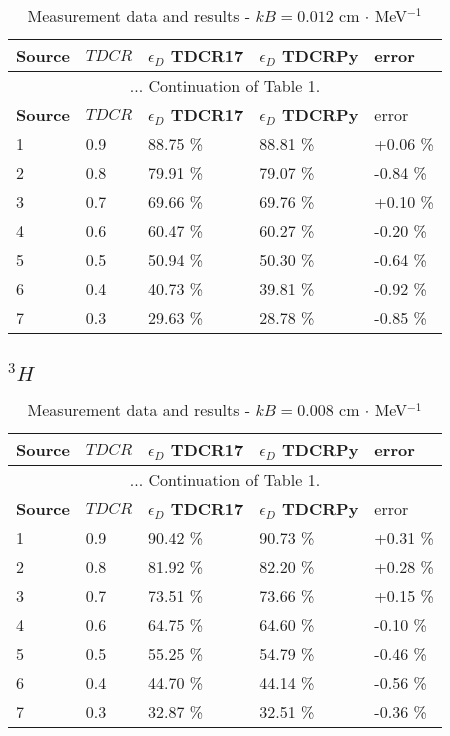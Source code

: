 \documentclass[12pt]{iopart}
\begin{document}
\begingroup
\footnotesize
\begin{longtable}[l]{| p{} | p{} |p{} |p{} |p{} |} 
\caption{Measurement data and results - $kB = 0.012$ cm $\cdot$ MeV$^{-1}$}
\label{Table1} \\ 
\hline
\textbf{Source} & \textbf{$TDCR$} & \textbf{$\epsilon_{D}$ TDCR17} & \textbf{$\epsilon_{D}$ TDCRPy} & error \\ 
\endfirsthead
\multicolumn{5}{c}{... Continuation of Table 1.}\\ 
\hline
 \textbf{Source} & \textbf{$TDCR$} & \textbf{$\epsilon_{D}$ TDCR17} & \textbf{$\epsilon_{D}$ TDCRPy} & error \\   \hline 
\endhead
\hline
 1 & 0.9   &   88.75 \% &   88.81 \% & +0.06 \% \\
 2 & 0.8   &   79.91 \% &   79.07 \% & -0.84 \% \\
 3 & 0.7   &   69.66 \% &   69.76 \% & +0.10 \% \\
 4 & 0.6   &   60.47 \% &   60.27 \% & -0.20 \% \\
 5 & 0.5   &   50.94 \% &   50.30 \% & -0.64 \% \\
 6 & 0.4   &   40.73 \% &   39.81 \% & -0.92 \% \\
 7 & 0.3   &   29.63 \% &   28.78 \% & -0.85 \% \\
\hline
\end{longtable} 
\endgroup


\subsection{$^{3}H$}

\begingroup
\footnotesize
\begin{longtable}[l]{| p{} | p{} |p{} |p{} |p{} |} 
\caption{Measurement data and results - $kB = 0.008$ cm $\cdot$ MeV$^{-1}$}
\label{Table1} \\ 
\hline
\textbf{Source} & \textbf{$TDCR$} & \textbf{$\epsilon_{D}$ TDCR17} & \textbf{$\epsilon_{D}$ TDCRPy} & error \\
\endfirsthead
\multicolumn{5}{c}{... Continuation of Table 1.}\\ 
\hline
 \textbf{Source} & \textbf{$TDCR$} & \textbf{$\epsilon_{D}$ TDCR17} & \textbf{$\epsilon_{D}$ TDCRPy} & error \\   \hline 
\endhead
\hline
 1 & 0.9   &   90.42 \% &   90.73 \% &  +0.31 \% \\
 2 & 0.8   &   81.92 \% &   82.20 \% &  +0.28 \% \\
 3 & 0.7   &   73.51 \% &   73.66 \% &  +0.15 \% \\
 4 & 0.6   &   64.75 \% &   64.60 \% &  -0.10 \% \\
 5 & 0.5   &   55.25 \% &   54.79 \% &  -0.46 \% \\
 6 & 0.4   &   44.70 \% &   44.14 \% &  -0.56 \% \\
 7 & 0.3   &   32.87 \% &   32.51 \% &  -0.36 \% \\
\hline
\end{longtable} 
\endgroup
\end{document}
